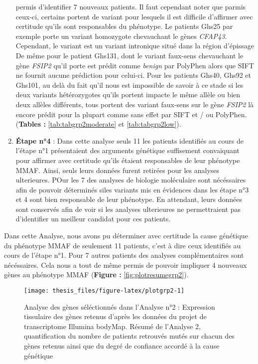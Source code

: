 \documentclass[12pt,twoside]{reedthesis}
\theoremstyle{definition}
\theoremstyle{definition}
\theoremstyle{remark}
\begin{document}
\begin{enumerate}
    permis d'identifier 7 nouveaux patients. Il faut cependant noter que
    parmis ceux-ci, certains portent de variant pour lesquels il est
    difficile d'affirmer avec certitude qu'ils sont responsables du
    phénotype. Le patients Ghs25 par exemple porte un variant homozygote
    chevauchant le gènes \emph{CFAP43}. Cependant, le variant est un
    variant intronique situé dans la région d'épissage De même pour le
    patient Ghs131, dont le variant faux-sens chevauchant le gène
    \emph{FSIP2} qu'il porte est prédit comme \emph{benign} par PolyPhen
    alors que SIFT ne fournit aucune prédiction pour celui-ci. Pour les
    patients Ghs40, Ghs92 et Ghs101, au delà du fait qu'il nous est
    impossible de savoir à ce stade si les deux variants hétérozygotes
    qu'ils portent impacte le même allèle ou bien deux allèles différents,
    tous portent des variant faux-sens sur le gène \emph{FSIP2} là encore
    prédit pour la plupart comme sans effet par SIFT et / ou PolyPhen.
    (\textbf{Tables : }\ref{tab:tabgrp2moderate} et \ref{tab:tabgrp2low}).
  \item
    \textbf{Étape n°4} : Dans cette analyse seuls 11 les patients
    identifiés au cours de l'étape n°1 présentaient des arguments
    génétique suffisement convaiquant pour affirmer avec certitude qu'ils
    étaient responsables de leur phénotype MMAF. Ainsi, seuls leurs
    données furent retirées pour les analyses ulterieures. POur les 7 des
    analyses de biologie moléculaire sont nécéssaires afin de pouvoir
    déterminés siles variants mis en évidences dans les étape n°3 et 4
    sont bien responsable de leur phénotype. En attendant, leurs données
    sont conservés afin de voir si les analyses ulterieures ne
    permettraient pas d'identifier un meilleur candidat pour ces patients.
  \end{enumerate}
  
  Dans cette Analyse, nous avons pu déterminer avec certitude la cause
  génétique du phénotype MMAF de seulement 11 patients, c'est à dire ceux
  identifiés au cours de l'étape n°1. Pour 7 autres patients des analyses
  complémentaires sont nécéssaires. Cela nous a tout de même permis de
  pouvoir impliquer 4 nouveaux gènes au phénotype MMAF (\textbf{Figure :}
  \ref{fig:plotresumegrp2}).
  
  \newpage  
  
  \begin{figure}
  
  {\centering \texttt{[image: thesis\_files/figure-latex/plotgrp2-1]} 
  
  }
  
  \caption[Analyse des gènes séléctionnés dans l'Analyse n°2]{Analyse des gènes séléctionnés dans l'Analyse n°2 : Expression tissulaire des gènes retenus d'après les données du projet de transcriptome Illumina bodyMap. Résumé de l'Analyse 2, quantification du nombre de patients retrouvés mutés sur chacun des gènes retenus ainsi que du degré de confiance accordé à la cause génétique}\label{fig:plotgrp2}
  \end{figure}
  
\end{document}
